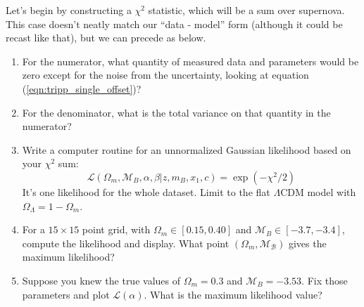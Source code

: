 \begin{enumerate}
    Let's begin by constructing a $\chi^2$ statistic, which will be a sum over supernova. This case doesn't neatly match our ``data - model'' form (although it could be recast like that), but we can precede as below. 
    \begin{enumerate}
    \item  For the numerator, what quantity of measured data and parameters would be zero except for the noise from the uncertainty, looking at equation (\ref{eqn:tripp_single_offset})?
    \item For the denominator, what is the total variance on that quantity in the numerator?

    \item Write a computer routine for an unnormalized Gaussian likelihood based on your $\chi^2$ sum:
      $$ \mathcal{L}(\Omega_m,\mathcal{M}_B,\alpha,\beta | z,m_B,x_1,c) = \exp(-\chi^2/2) $$
      It's one likelihood for the whole dataset.  Limit to the flat $\Lambda$CDM model with $\Omega_\Lambda = 1 - \Omega_m$.
    \item For a $15 \times 15$ point grid, with $\Omega_m \in [0.15,0.40]$ and $\mathcal{M}_B \in [-3.7,-3.4]$, compute the likelihood and display.  What point $(\Omega_m,\mathcal{M_B})$ gives the maximum likelihood?

    \item Suppose you knew the true values of $\Omega_m = 0.3$ and $\mathcal{M}_B = -3.53$.   Fix those parameters and plot $\mathcal{L}(\alpha)$.  What is the maximum likelihood value?
    \end{enumerate}

\end{enumerate}

 
